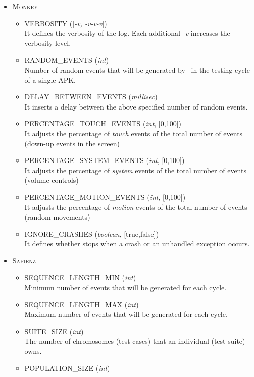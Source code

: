 \begin{itemize}
\item \textsc{Monkey}
\begin{itemize}
\item VERBOSITY ([\textit{-v, -v-v-v}]) \\
It defines the verbosity of the log. Each additional \textit{-v} increases the verbosity level. 
\item RANDOM\_EVENTS (\textit{int})\\
Number of random events that will be generated by \monkey\ in the testing cycle of a single APK.
\item DELAY\_BETWEEN\_EVENTS (\textit{millisec})\\
It inserts a delay between the above specified number of random events. 
\item PERCENTAGE\_TOUCH\_EVENTS (\textit{int}, [0,100])\\
It adjusts the percentage of \textit{touch} events of the total number of events (\eg down-up events in the screen) 
\item PERCENTAGE\_SYSTEM\_EVENTS (\textit{int}, [0,100])\\
It adjusts the percentage of \textit{system} events of the total number of events (\eg volume controls) 
\item PERCENTAGE\_MOTION\_EVENTS (\textit{int}, [0,100])\\
It adjusts the percentage of \textit{motion} events of the total number of events (\eg random movements) 
\item IGNORE\_CRASHES (\textit{boolean}, [true,false])\\
It defines whether \monkey stops when a crash or an unhandled exception occurs. 
\end{itemize}
\clearpage
\item \textsc{Sapienz}
\begin{itemize}
\item SEQUENCE\_LENGTH\_MIN (\textit{int})\\
Minimum number of events that will be generated for each \sapienz cycle. 
\item SEQUENCE\_LENGTH\_MAX (\textit{int})\\
Maximum number of events that will be generated for each \sapienz cycle. 
\item SUITE\_SIZE (\textit{int})\\
The number of chromosomes (\ie test cases) that an individual (\ie test suite) owns. 
\item POPULATION\_SIZE (\textit{int})\\

\end{itemize}
\end{itemize}

